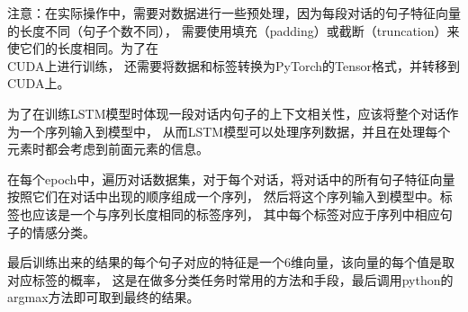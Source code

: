\documentclass[11pt]{article}
\begin{document}
            注意：在实际操作中，需要对数据进行一些预处理，因为每段对话的句子特征向量的长度不同（句子个数不同），
            需要使用填充（padding）或截断（truncation）来使它们的长度相同。为了在\\CUDA上进行训练，
            还需要将数据和标签转换为PyTorch的Tensor格式，并转移到CUDA上。
            
            为了在训练LSTM模型时体现一段对话内句子的上下文相关性，应该将整个对话作为一个序列输入到模型中，
            从而LSTM模型可以处理序列数据，并且在处理每个元素时都会考虑到前面元素的信息。
            
            在每个epoch中，遍历对话数据集，对于每个对话，将对话中的所有句子特征向量按照它们在对话中出现的顺序组成一个序列，
            然后将这个序列输入到模型中。标签也应该是一个与序列长度相同的标签序列，
            其中每个标签对应于序列中相应句子的情感分类。
            
            最后训练出来的结果的每个句子对应的特征是一个6维向量，该向量的每个值是取对应标签的概率，
            这是在做多分类任务时常用的方法和手段，最后调用python的argmax方法即可取到最终的结果。
            
\end{document}
